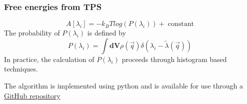 \documentclass{beamer}
\begin{document}
\begin{frame}
\frametitle{Free energies from TPS}
\begin{equation}
A[\lambda_i] = -k_BTlog(P(\lambda_i)) +\;\text{constant} \nonumber 
\end{equation}
The probability of $P(\lambda_i)$ is defined by
\begin{equation}
P(\lambda_i) = \int \textbf{dV} \rho({\vec{q}})\delta(\lambda_i-\tilde{\lambda}(\vec{q})) \nonumber 
\end{equation}
In practice, the calculation of $P(\lambda_i)$ proceeds through histogram based techniques. 
\pause
\begin{block}{}
The algorithm is implemented using python and is available for use through a
\href{https://github.com/sreeganb/free-energy-tps}{GitHub repository}
\end{block}
\end{frame}
\end{document}
